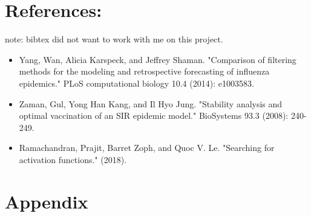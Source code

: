 \section{References:}
note: bibtex did not want to work with me on this project.
\begin{itemize}
\item Yang, Wan, Alicia Karspeck, and Jeffrey Shaman. "Comparison of filtering methods for the modeling and retrospective forecasting of influenza epidemics." PLoS computational biology 10.4 (2014): e1003583.

\item Zaman, Gul, Yong Han Kang, and Il Hyo Jung. "Stability analysis and optimal vaccination of an SIR epidemic model." BioSystems 93.3 (2008): 240-249.

\item Ramachandran, Prajit, Barret Zoph, and Quoc V. Le. "Searching for activation functions." (2018).\label{ref:3}

\end{itemize}



\section{Appendix}\label{sec:appendix}
















